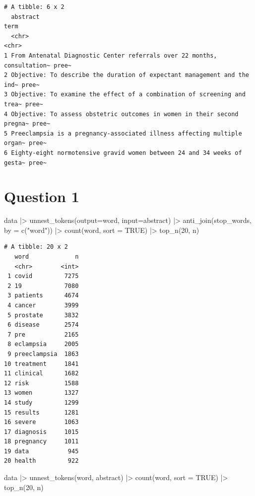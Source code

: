 \documentclass[
  letterpaper,
  DIV=11,
  numbers=noendperiod]{scrartcl}
\newenvironment{Shaded}{\begin{snugshade}}{\end{snugshade}}
\newcommand{\AttributeTok}[1]{\textcolor[rgb]{0.40,0.45,0.13}{#1}}
\newcommand{\ConstantTok}[1]{\textcolor[rgb]{0.56,0.35,0.01}{#1}}
\newcommand{\DecValTok}[1]{\textcolor[rgb]{0.68,0.00,0.00}{#1}}
\newcommand{\FunctionTok}[1]{\textcolor[rgb]{0.28,0.35,0.67}{#1}}
\newcommand{\NormalTok}[1]{\textcolor[rgb]{0.00,0.23,0.31}{#1}}
\newcommand{\SpecialCharTok}[1]{\textcolor[rgb]{0.37,0.37,0.37}{#1}}
\newcommand{\StringTok}[1]{\textcolor[rgb]{0.13,0.47,0.30}{#1}}
\begin{document}
\begin{verbatim}
# A tibble: 6 x 2
  abstract                                                                 term 
  <chr>                                                                    <chr>
1 From Antenatal Diagnostic Center referrals over 22 months, consultation~ pree~
2 Objective: To describe the duration of expectant management and the ind~ pree~
3 Objective: To examine the effect of a combination of screening and trea~ pree~
4 Objective: To assess obstetric outcomes in women in their second pregna~ pree~
5 Preeclampsia is a pregnancy-associated illness affecting multiple organ~ pree~
6 Eighty-eight normotensive gravid women between 24 and 34 weeks of gesta~ pree~
\end{verbatim}

\hypertarget{question-1}{%
\section{Question 1}\label{question-1}}

\begin{Shaded}
\begin{Highlighting}[]
\NormalTok{data }\SpecialCharTok{|\textgreater{}} \FunctionTok{unnest\_tokens}\NormalTok{(}\AttributeTok{output=}\NormalTok{word, }\AttributeTok{input=}\NormalTok{abstract) }\SpecialCharTok{|\textgreater{}}
  \FunctionTok{anti\_join}\NormalTok{(stop\_words, }\AttributeTok{by =} \FunctionTok{c}\NormalTok{(}\StringTok{"word"}\NormalTok{)) }\SpecialCharTok{|\textgreater{}}
  \FunctionTok{count}\NormalTok{(word, }\AttributeTok{sort =} \ConstantTok{TRUE}\NormalTok{) }\SpecialCharTok{|\textgreater{}}
  \FunctionTok{top\_n}\NormalTok{(}\DecValTok{20}\NormalTok{, n)}
\end{Highlighting}
\end{Shaded}

\begin{verbatim}
# A tibble: 20 x 2
   word             n
   <chr>        <int>
 1 covid         7275
 2 19            7080
 3 patients      4674
 4 cancer        3999
 5 prostate      3832
 6 disease       2574
 7 pre           2165
 8 eclampsia     2005
 9 preeclampsia  1863
10 treatment     1841
11 clinical      1682
12 risk          1588
13 women         1327
14 study         1299
15 results       1281
16 severe        1063
17 diagnosis     1015
18 pregnancy     1011
19 data           945
20 health         922
\end{verbatim}

\begin{Shaded}
\begin{Highlighting}[]
\NormalTok{data }\SpecialCharTok{|\textgreater{}} \FunctionTok{unnest\_tokens}\NormalTok{(word, abstract) }\SpecialCharTok{|\textgreater{}}
  \FunctionTok{count}\NormalTok{(word, }\AttributeTok{sort =} \ConstantTok{TRUE}\NormalTok{) }\SpecialCharTok{|\textgreater{}}
  \FunctionTok{top\_n}\NormalTok{(}\DecValTok{20}\NormalTok{, n)}
\end{Highlighting}
\end{Shaded}
\end{document}
